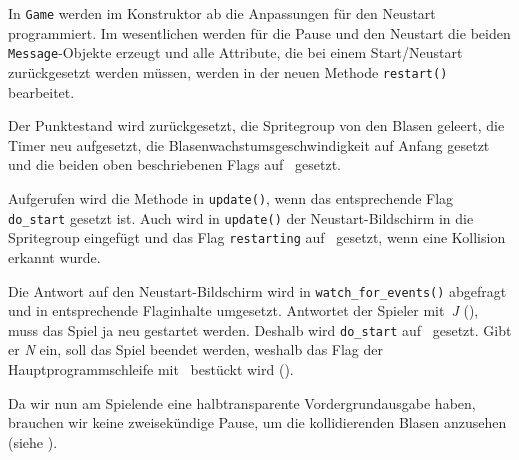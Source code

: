 

In \texttt{Game} werden im Konstruktor ab  die Anpassungen für den Neustart programmiert. Im wesentlichen werden für die Pause und den Neustart die beiden \texttt{Message}-Objekte erzeugt und alle Attribute, die bei einem Start/Neustart zurückgesetzt werden müssen, werden in der neuen Methode \texttt{restart()} bearbeitet.


Der Punktestand wird zurückgesetzt, die Spritegroup von den Blasen geleert, die Timer neu aufgesetzt, die Blasenwachstumsgeschwindigkeit auf Anfang gesetzt und die beiden oben beschriebenen Flags auf \false\ gesetzt.



Aufgerufen wird die Methode in \texttt{update()}, wenn das entsprechende Flag \texttt{do\_start} gesetzt ist. Auch wird in \texttt{update()} der Neustart-Bildschirm in die Spritegroup eingefügt und das Flag \texttt{restarting} auf \true\ gesetzt, wenn eine Kollision erkannt wurde. 



Die Antwort auf den Neustart-Bildschirm wird in \texttt{watch\_for\_events()} abgefragt und in entsprechende Flaginhalte umgesetzt. Antwortet der Spieler mit~\emph{J} (), muss das Spiel ja neu gestartet werden. Deshalb wird \texttt{do\_start} auf \true\ gesetzt. Gibt er \emph{N} ein, soll das Spiel beendet werden, weshalb das Flag der Hauptprogrammschleife mit \false\ bestückt wird ().


Da wir nun am Spielende eine halbtransparente Vordergrundausgabe haben, brauchen wir keine zweisekündige Pause, um die kollidierenden Blasen anzusehen (siehe ). %

